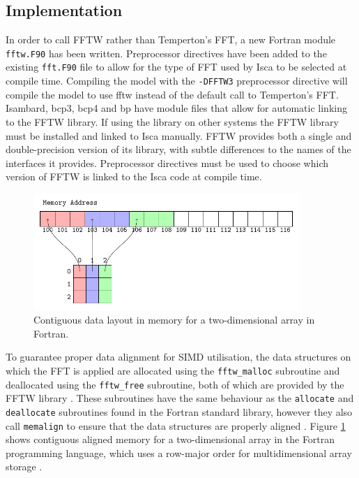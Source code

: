 \documentclass[a4paper,11pt]{report}
\begin{document}
\subsection{Implementation}
In order to call FFTW rather than Temperton's FFT, a new Fortran module \texttt{fftw.F90} has been written. Preprocessor directives have been added to the existing \texttt{fft.F90} file to allow for the type of FFT used by Isca to be selected at compile time. Compiling the model with the \texttt{-DFFTW3} preprocessor directive will compile the model to use \gls{fftw} instead of the default call to Temperton's FFT. Isambard, \gls{bcp3}, \gls{bcp4} and \gls{bp} have module files that allow for automatic linking to the FFTW library. If using the library on other systems the FFTW library must be installed and linked to Isca manually. FFTW provides both a single and double-precision version of its library, with subtle differences to the names of the interfaces it provides. Preprocessor directives must be used to choose which version of FFTW is linked to the Isca code at compile time. 
\par
\begin{figure}[htbp]
\begin{center}
\includegraphics[width=0.9\textwidth]{img/tikz-img/data_layout/data_layout.pdf}
\caption[Two-dimensional data layout in Fortran]{Contiguous data layout in memory for a two-dimensional array in Fortran.}
\label{fig:memalign}
\end{center}
\end{figure}
\par
To guarantee proper data alignment for SIMD utilisation, the data structures on which the FFT is applied are allocated using the \texttt{fftw\_malloc} subroutine and deallocated using the \texttt{fftw\_free} subroutine, both of which are provided by the FFTW library \cite{frigo2005design}. These subroutines have the same behaviour as the \texttt{allocate} and \texttt{deallocate} subroutines found in the Fortran standard library, however they also call \texttt{memalign} to ensure that the data structures are properly aligned \cite{frigo2003fftw}. Figure \ref{fig:memalign} shows contiguous aligned memory for a two-dimensional array in the Fortran programming language, which uses a row-major order for multidimensional array storage \cite{lahey1994fortran}.
\end{document}
